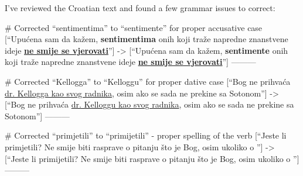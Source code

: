 I've reviewed the Croatian text and found a few grammar issues to correct:

# Corrected “sentimentima” to “sentimente” for proper accusative case
[“Upućena sam da kažem, \textbf{sentimentima} onih koji traže napredne znanstvene ideje \textbf{\underline{ne smije se vjerovati}}”]
->
[“Upućena sam da kažem, \textbf{sentimente} onih koji traže napredne znanstvene ideje \textbf{\underline{ne smije se vjerovati}}”]
---------

# Corrected “Kellogga” to “Kelloggu” for proper dative case
[“Bog ne prihvaća \underline{dr. Kellogga kao svog radnika}, osim ako se sada ne prekine sa Sotonom”]
->
[“Bog ne prihvaća \underline{dr. Kelloggu kao svog radnika}, osim ako se sada ne prekine sa Sotonom”]
---------

# Corrected “primjetili” to “primijetili” - proper spelling of the verb
[“Jeste li primjetili? Ne smije biti rasprave o pitanju što je Bog, osim ukoliko  o ”]
->
[“Jeste li primijetili? Ne smije biti rasprave o pitanju što je Bog, osim ukoliko  o ”]
---------